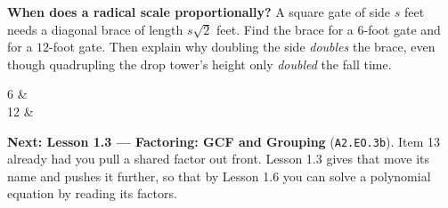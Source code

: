 \documentclass[10pt]{article}
\begin{document}
\vspace{0.10in}

\boxguard[22]
\begin{extensionbox}
\small
\textbf{When does a radical scale proportionally?} A square gate of side $s$ feet needs a diagonal
brace of length $s\sqrt{2}$ feet. Find the brace for a $6$-foot gate and for a $12$-foot gate.
Then explain why doubling the side \emph{doubles} the brace, even though quadrupling the drop
tower's height only \emph{doubled} the fall time.
\begin{work}
  6 &  \\
  12 & 
\end{work}
\end{extensionbox}

\vspace{0.10in}

\begin{remindbox}
\small
\textbf{Next: Lesson 1.3 --- Factoring: GCF and Grouping} (\texttt{A2.EO.3b}). Item 13 already had
you pull a shared factor out front. Lesson 1.3 gives that move its name and pushes it further, so
that by Lesson 1.6 you can solve a polynomial equation by reading its factors.
\end{remindbox}
\end{document}

